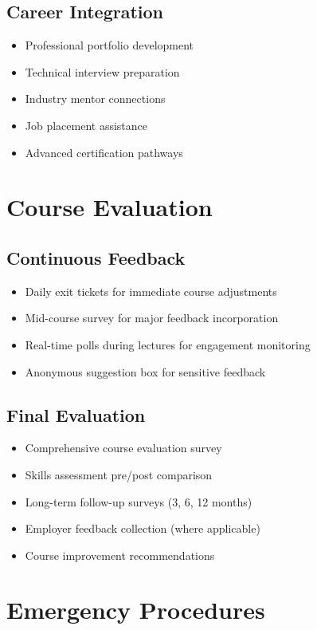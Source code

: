 \documentclass[11pt,a4paper]{article}
\begin{document}
\subsection{Career Integration}
\begin{itemize}
    \item Professional portfolio development
    \item Technical interview preparation
    \item Industry mentor connections
    \item Job placement assistance
    \item Advanced certification pathways
\end{itemize}

\section{Course Evaluation}

\subsection{Continuous Feedback}
\begin{itemize}
    \item Daily exit tickets for immediate course adjustments
    \item Mid-course survey for major feedback incorporation
    \item Real-time polls during lectures for engagement monitoring
    \item Anonymous suggestion box for sensitive feedback
\end{itemize}

\subsection{Final Evaluation}
\begin{itemize}
    \item Comprehensive course evaluation survey
    \item Skills assessment pre/post comparison
    \item Long-term follow-up surveys (3, 6, 12 months)
    \item Employer feedback collection (where applicable)
    \item Course improvement recommendations
\end{itemize}

\section{Emergency Procedures}
\end{document}
